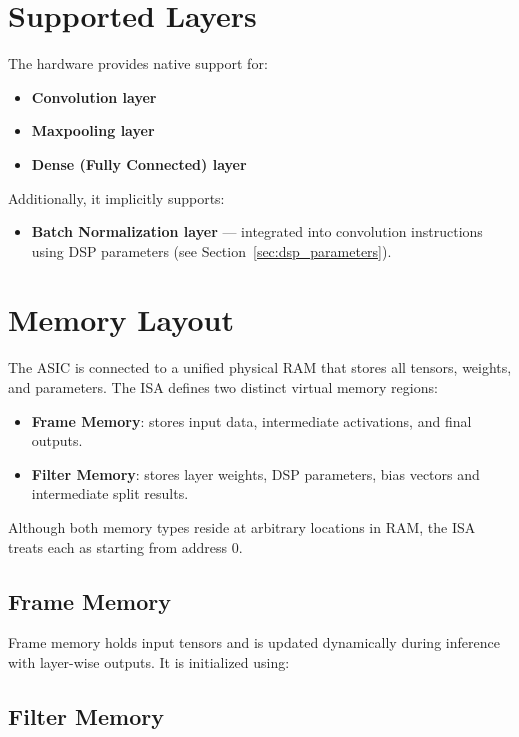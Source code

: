 \documentclass[12pt]{report}
\begin{document}
\section{Supported Layers}

The hardware provides native support for:
\begin{itemize}
    \item \textbf{Convolution layer}
    \item \textbf{Maxpooling layer}
    \item \textbf{Dense (Fully Connected) layer}
\end{itemize}

\noindent Additionally, it implicitly supports:
\begin{itemize}
    \item \textbf{Batch Normalization layer} — integrated into convolution instructions using DSP parameters (see Section~\ref{sec:dsp_parameters}).
\end{itemize}

\section{Memory Layout}

The ASIC is connected to a unified physical RAM that stores all tensors, weights, and parameters. The ISA defines two distinct virtual memory regions:

\begin{itemize}
    \item \textbf{Frame Memory}: stores input data, intermediate activations, and final outputs.
    \item \textbf{Filter Memory}: stores layer weights, DSP parameters, bias vectors and intermediate split results.
\end{itemize}

Although both memory types reside at arbitrary locations in RAM, the ISA treats each as starting from address 0.

\subsection{Frame Memory}

Frame memory holds input tensors and is updated dynamically during inference with layer-wise outputs. It is initialized using:

\subsection{Filter Memory}
\end{document}
